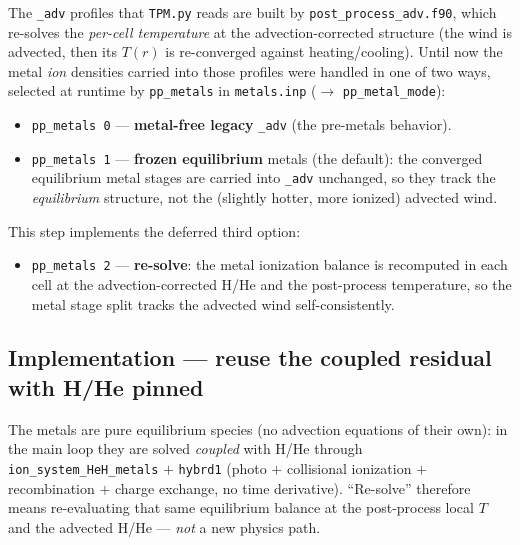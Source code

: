 \documentclass[english,a4paper]{kiseon_memo}
\begin{document}
The \texttt{\_adv} profiles that \texttt{TPM.py} reads are built by
\texttt{post\_process\_adv.f90}, which re-solves the \emph{per-cell temperature}
at the advection-corrected structure (the wind is advected, then its \(T(r)\) is
re-converged against heating/cooling). Until now the metal \emph{ion} densities
carried into those profiles were handled in one of two ways, selected at runtime
by \texttt{pp\_metals} in \texttt{metals.inp} (\(\rightarrow\)
\texttt{pp\_metal\_mode}):
\begin{itemize}
  \item \texttt{pp\_metals 0} --- \textbf{metal-free legacy} \texttt{\_adv} (the
    pre-metals behavior).
  \item \texttt{pp\_metals 1} --- \textbf{frozen equilibrium} metals (the
    default): the converged equilibrium metal stages are carried into
    \texttt{\_adv} unchanged, so they track the \emph{equilibrium} structure, not
    the (slightly hotter, more ionized) advected wind.
\end{itemize}
This step implements the deferred third option:
\begin{itemize}
  \item \texttt{pp\_metals 2} --- \textbf{re-solve}: the metal ionization balance
    is recomputed in each cell at the advection-corrected H/He and the
    post-process temperature, so the metal stage split tracks the advected wind
    self-consistently.
\end{itemize}

\subsection{Implementation --- reuse the coupled residual with H/He pinned}
The metals are pure equilibrium species (no advection equations of their own): in
the main loop they are solved \emph{coupled} with H/He through
\texttt{ion\_system\_HeH\_metals} \(+\) \texttt{hybrd1} (photo \(+\) collisional
ionization \(+\) recombination \(+\) charge exchange, no time derivative).
``Re-solve'' therefore means re-evaluating that same equilibrium balance at the
post-process local \(T\) and the advected H/He --- \emph{not} a new physics path.
\end{document}
